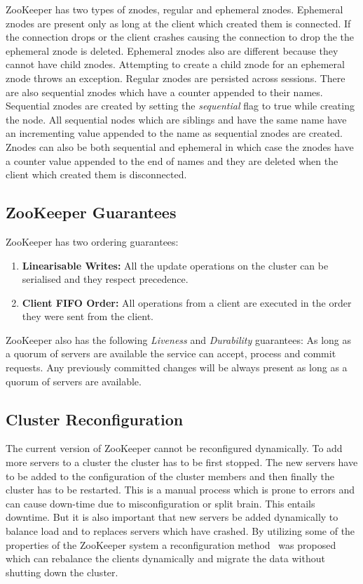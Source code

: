 \vspace{1.5em}

\vspace{1.5em}

ZooKeeper has two types of znodes, regular and ephemeral znodes. Ephemeral znodes are present only as long at the client which created them is connected. If the connection drops or the client crashes causing the connection to drop the the ephemeral znode is deleted. Ephemeral znodes also are different because they cannot have child znodes. Attempting to create a child znode for an ephemeral znode throws an exception. Regular znodes are persisted across sessions. There are also sequential znodes which have a counter appended to their names. Sequential znodes are created by setting the \textit{sequential} flag to true while creating the node. All sequential nodes which are siblings and have the same name have an incrementing value appended to the name as sequential znodes are created. Znodes can also be both sequential and ephemeral in which case the znodes have a counter value appended to the end of names and they are deleted when the client which created them is disconnected.

\subsection{ZooKeeper Guarantees}
ZooKeeper has two ordering guarantees:
\begin{enumerate}
	\item \textbf{Linearisable Writes:} All the update operations on the cluster can be serialised and they respect precedence.
	\item \textbf{Client FIFO Order:} All operations from a client are executed in the order they were sent from the client.
\end{enumerate}
ZooKeeper also has the following \textit{Liveness} and \textit{Durability} guarantees: As long as a quorum of servers are available the service can accept, process and commit requests. Any previously committed changes will be always present as long as a quorum of servers are available.

\subsection{Cluster Reconfiguration}
	The current version of ZooKeeper cannot be reconfigured dynamically. To add more servers to a cluster the cluster has to be first stopped. The new servers have to be added to the configuration of the cluster members and then finally the cluster has to be restarted. This is a manual process which is prone to errors and can cause down-time due to misconfiguration or split brain. This entails downtime. But it is also important that new servers be added dynamically to balance load and to replaces servers which have crashed. By utilizing some of the properties of the ZooKeeper system a reconfiguration method~\cite{shraer2012dynamic} was proposed which can rebalance the clients dynamically and migrate the data without shutting down the cluster.

